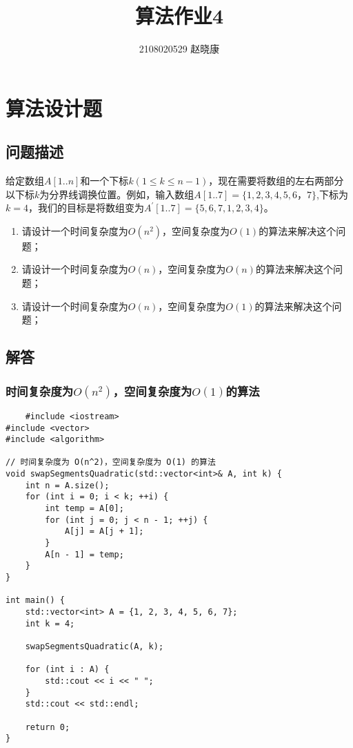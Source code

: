 \documentclass{article}
\begin{document}
\title{算法作业4}
\author{2108020529 赵晓康} %
\maketitle

\section{算法设计题}
\subsection{问题描述}

给定数组$A[1..n]$和一个下标$k(1\leq k \leq n-1)$，现在需要将数组的左右两部分以下标$k$为分界线调换位置。例如，输入数组$A[1..7]=\{1,2,3,4,5,6，7\}$,下标为$k=4$，我们的目标是将数组变为$A^{\prime}[1..7]=\{5,6,7,1,2,3,4\}$。

\begin{enumerate}
    \item 请设计一个时间复杂度为$O(n^2)$，空间复杂度为$O(1)$的算法来解决这个问题；
    \item 请设计一个时间复杂度为$O(n)$，空间复杂度为$O(n)$的算法来解决这个问题；
    \item 请设计一个时间复杂度为$O(n)$，空间复杂度为$O(1)$的算法来解决这个问题；
\end{enumerate}

\subsection{解答}
\subsubsection{时间复杂度为$O(n^2)$，空间复杂度为$O(1)$的算法}
\begin{lstlisting}
    #include <iostream>
#include <vector>
#include <algorithm>

// 时间复杂度为 O(n^2)，空间复杂度为 O(1) 的算法
void swapSegmentsQuadratic(std::vector<int>& A, int k) {
    int n = A.size();
    for (int i = 0; i < k; ++i) {
        int temp = A[0];
        for (int j = 0; j < n - 1; ++j) {
            A[j] = A[j + 1];
        }
        A[n - 1] = temp;
    }
}

int main() {
    std::vector<int> A = {1, 2, 3, 4, 5, 6, 7};
    int k = 4;

    swapSegmentsQuadratic(A, k);

    for (int i : A) {
        std::cout << i << " ";
    }
    std::cout << std::endl;

    return 0;
}
\end{lstlisting}
\end{document}
